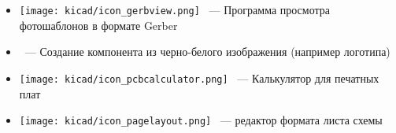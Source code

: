 


\begin{itemize}
\item
\texttt{[image: kicad/icon\_gerbview.png]}
\ --- Программа просмотра фотошаблонов в формате Gerber
\item
{}\ --- Создание компонента из черно-белого изображения
(например логотипа)
\item
\texttt{[image: kicad/icon\_pcbcalculator.png]}
\ --- Калькулятор для печатных плат
\item
\texttt{[image: kicad/icon\_pagelayout.png]}
\ --- редактор формата листа схемы
\end{itemize}






